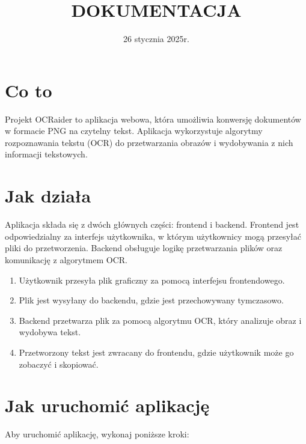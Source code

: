 \documentclass{article}
\title{DOKUMENTACJA}
\author{}
\date{26 stycznia 2025r.}
\begin{document}
\maketitle

\section{Co to}
Projekt OCRaider to aplikacja webowa, która umożliwia konwersję dokumentów w formacie PNG na czytelny tekst. Aplikacja wykorzystuje algorytmy rozpoznawania tekstu (OCR) do przetwarzania obrazów i wydobywania z nich informacji tekstowych.

\section{Jak działa}
Aplikacja składa się z dwóch głównych części: frontend i backend. Frontend jest odpowiedzialny za interfejs użytkownika, w którym użytkownicy mogą przesyłać pliki do przetworzenia. Backend obsługuje logikę przetwarzania plików oraz komunikację z algorytmem OCR.

\begin{enumerate}
    \item Użytkownik przesyła plik graficzny za pomocą interfejsu frontendowego.
    \item Plik jest wysyłany do backendu, gdzie jest przechowywany tymczasowo.
    \item Backend przetwarza plik za pomocą algorytmu OCR, który analizuje obraz i wydobywa tekst.
    \item Przetworzony tekst jest zwracany do frontendu, gdzie użytkownik może go zobaczyć i skopiować.
\end{enumerate}

\section{Jak uruchomić aplikację}
Aby uruchomić aplikację, wykonaj poniższe kroki:
\end{document}
